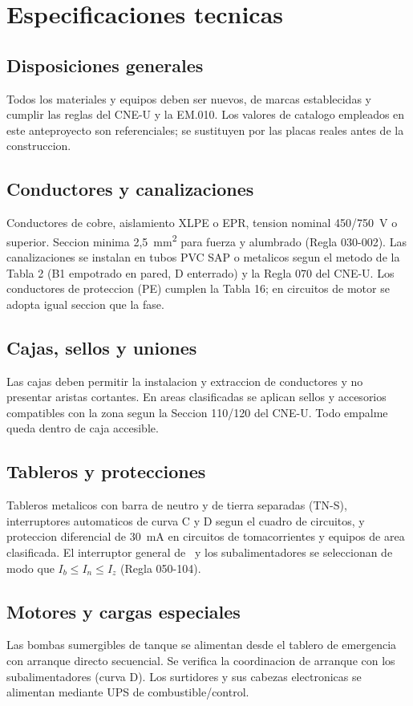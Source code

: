 \chapter{Especificaciones tecnicas}

\section{Disposiciones generales}
Todos los materiales y equipos deben ser nuevos, de marcas establecidas y
cumplir las reglas del CNE-U y la EM.010. Los valores de catalogo empleados
en este anteproyecto son referenciales; se sustituyen por las placas reales
antes de la construccion.

\section{Conductores y canalizaciones}
Conductores de cobre, aislamiento XLPE o EPR, tension nominal 450/750~V o
superior. Seccion minima 2,5~mm\textsuperscript{2} para fuerza y alumbrado
(Regla 030-002). Las canalizaciones se instalan en tubos PVC SAP o metalicos
segun el metodo de la Tabla 2 (B1 empotrado en pared, D enterrado) y la Regla
070 del CNE-U. Los conductores de proteccion (PE) cumplen la Tabla 16; en
circuitos de motor se adopta igual seccion que la fase.

\section{Cajas, sellos y uniones}
Las cajas deben permitir la instalacion y extraccion de conductores y no
presentar aristas cortantes. En areas clasificadas se aplican sellos y
accesorios compatibles con la zona segun la Seccion 110/120 del CNE-U. Todo
empalme queda dentro de caja accesible.

\section{Tableros y protecciones}
Tableros metalicos con barra de neutro y de tierra separadas (TN-S),
interruptores automaticos de curva C y D segun el cuadro de circuitos, y
proteccion diferencial de 30~mA en circuitos de tomacorrientes y equipos de
area clasificada. El interruptor general de \IPrincipal~y los subalimentadores
se seleccionan de modo que \(I_b \leq I_n \leq I_z\) (Regla 050-104).

\section{Motores y cargas especiales}
Las bombas sumergibles de tanque se alimentan desde el tablero de emergencia
con arranque directo secuencial. Se verifica la coordinacion de arranque con
los subalimentadores (curva D). Los surtidores y sus cabezas electronicas se
alimentan mediante UPS de combustible/control.

